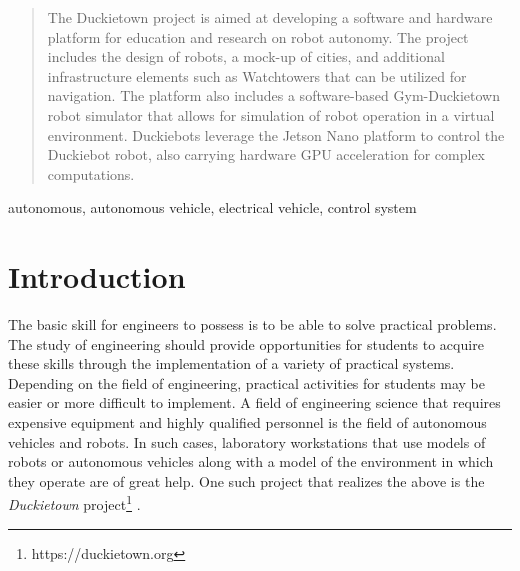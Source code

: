 \documentclass[conference]{IEEEtran}
\begin{document}
\maketitle              %

\begin{abstract}
The Duckietown project is aimed at developing a software and hardware platform for education and research on robot autonomy. The project includes the design of robots, a mock-up of cities, and additional infrastructure elements such as Watchtowers that can be utilized for navigation. The platform also includes a software-based Gym-Duckietown robot simulator that allows for simulation of robot operation in a virtual environment. Duckiebots leverage the Jetson Nano platform to control the Duckiebot robot, also carrying hardware GPU acceleration for complex computations.
\end{abstract}


\begin{IEEEkeywords}
autonomous, autonomous vehicle, electrical vehicle, control system
\end{IEEEkeywords}
%
\section{Introduction}
The basic skill for engineers to possess is to be able to solve practical problems. The study of engineering should provide opportunities for students to acquire these skills through the implementation of a variety of practical systems. Depending on the field of engineering, practical activities for students may be easier or more difficult to implement. A field of engineering science that requires expensive equipment and highly qualified personnel is the field of autonomous vehicles and robots.
In such cases, laboratory workstations that use models of robots or autonomous vehicles along with a model of the environment in which they operate are of great help.
One such project that realizes the above is the \emph{Duckietown} project\footnote{https://duckietown.org} \cite{tani2017duckietown}.
\end{document}
